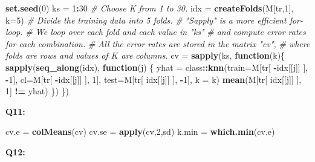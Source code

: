 \documentclass[]{article}
\newenvironment{Shaded}{\begin{snugshade}}{\end{snugshade}}
\newcommand{\KeywordTok}[1]{\textcolor[rgb]{0.13,0.29,0.53}{\textbf{#1}}}
\newcommand{\DataTypeTok}[1]{\textcolor[rgb]{0.13,0.29,0.53}{#1}}
\newcommand{\DecValTok}[1]{\textcolor[rgb]{0.00,0.00,0.81}{#1}}
\newcommand{\StringTok}[1]{\textcolor[rgb]{0.31,0.60,0.02}{#1}}
\newcommand{\CommentTok}[1]{\textcolor[rgb]{0.56,0.35,0.01}{\textit{#1}}}
\newcommand{\ControlFlowTok}[1]{\textcolor[rgb]{0.13,0.29,0.53}{\textbf{#1}}}
\newcommand{\OperatorTok}[1]{\textcolor[rgb]{0.81,0.36,0.00}{\textbf{#1}}}
\newcommand{\NormalTok}[1]{#1}
\begin{document}
\begin{Shaded}
\begin{Highlighting}[]
\KeywordTok{set.seed}\NormalTok{(}\DecValTok{0}\NormalTok{)}
\NormalTok{ks =}\StringTok{ }\DecValTok{1}\OperatorTok{:}\DecValTok{30} \CommentTok{# Choose K from 1 to 30.}
\NormalTok{idx =}\StringTok{ }\KeywordTok{createFolds}\NormalTok{(M[tr,}\DecValTok{1}\NormalTok{], }\DataTypeTok{k=}\DecValTok{5}\NormalTok{) }\CommentTok{# Divide the training data into 5 folds.}
\CommentTok{# "Sapply" is a more efficient for-loop. }
\CommentTok{# We loop over each fold and each value in "ks"}
\CommentTok{# and compute error rates for each combination.}
\CommentTok{# All the error rates are stored in the matrix "cv", }
\CommentTok{# where folds are rows and values of $K$ are columns.}
\NormalTok{cv =}\StringTok{ }\KeywordTok{sapply}\NormalTok{(ks, }\ControlFlowTok{function}\NormalTok{(k)\{ }
  \KeywordTok{sapply}\NormalTok{(}\KeywordTok{seq_along}\NormalTok{(idx), }\ControlFlowTok{function}\NormalTok{(j) \{}
\NormalTok{    yhat =}\StringTok{ }\NormalTok{class}\OperatorTok{::}\KeywordTok{knn}\NormalTok{(}\DataTypeTok{train=}\NormalTok{M[tr[ }\OperatorTok{-}\NormalTok{idx[[j]] ], }\OperatorTok{-}\DecValTok{1}\NormalTok{],}
               \DataTypeTok{cl=}\NormalTok{M[tr[ }\OperatorTok{-}\NormalTok{idx[[j]] ], }\DecValTok{1}\NormalTok{],}
               \DataTypeTok{test=}\NormalTok{M[tr[ idx[[j]] ], }\OperatorTok{-}\DecValTok{1}\NormalTok{], }\DataTypeTok{k =}\NormalTok{ k)}
    \KeywordTok{mean}\NormalTok{(M[tr[ idx[[j]] ], }\DecValTok{1}\NormalTok{] }\OperatorTok{!=}\StringTok{ }\NormalTok{yhat)}
\NormalTok{  \})}
\NormalTok{\})}
\end{Highlighting}
\end{Shaded}

\textbf{Q11:}

\begin{Shaded}
\begin{Highlighting}[]
\NormalTok{cv.e =}\StringTok{ }\KeywordTok{colMeans}\NormalTok{(cv)}
\NormalTok{cv.se =}\StringTok{ }\KeywordTok{apply}\NormalTok{(cv,}\DecValTok{2}\NormalTok{,sd)}
\NormalTok{k.min =}\StringTok{ }\KeywordTok{which.min}\NormalTok{(cv.e)}
\end{Highlighting}
\end{Shaded}

\textbf{Q12:}
\end{document}
